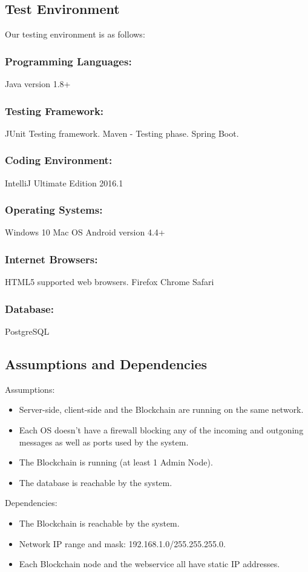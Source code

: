 \documentclass[11pt]{article}
\begin{document}
	\subsection{Test Environment}
	Our testing environment is as follows:
	\subsubsection{Programming Languages:}
	Java version 1.8+
	\subsubsection{Testing Framework:}
	JUnit Testing framework.\newline
	Maven - Testing phase.
	Spring Boot.
	\subsubsection{Coding Environment:}
	IntelliJ Ultimate Edition 2016.1
	\subsubsection{Operating Systems:}
	Windows 10\newline
	Mac OS\newline
	Android version 4.4+
	\subsubsection{Internet Browsers:}
	HTML5 supported web browsers.\newline
	Firefox\newline
	Chrome\newline
	Safari
	\subsubsection{Database:}
	PostgreSQL
	\subsection{Assumptions and Dependencies}
	Assumptions:
	\begin{itemize}
		\item Server-side, client-side and the Blockchain are running on the same network.
		\item Each OS doesn't have a firewall blocking any of the incoming and outgoning messages as well as ports used by the system.
		\item The Blockchain is running (at least 1 Admin Node).
		\item The database is reachable by the system.
	\end{itemize}
	Dependencies:
	\begin{itemize}
		\item The Blockchain is reachable by the system.
		\item Network IP range and mask: 192.168.1.0/255.255.255.0.
		\item Each Blockchain node and the webservice all have static IP addresses.
	\end{itemize}
	\newpage	
	
\end{document}
